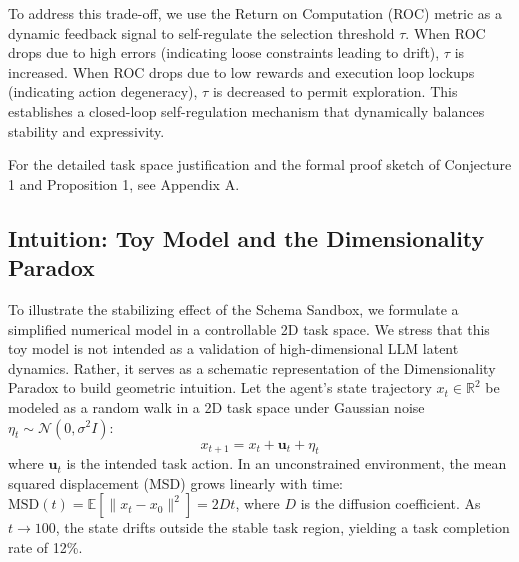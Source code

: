 \documentclass[10pt,journal,compsoc]{IEEEtran}
\begin{document}
To address this trade-off, we use the Return on Computation (ROC) metric as a dynamic feedback signal to self-regulate the selection threshold $\tau$. When ROC drops due to high errors (indicating loose constraints leading to drift), $\tau$ is increased. When ROC drops due to low rewards and execution loop lockups (indicating action degeneracy), $\tau$ is decreased to permit exploration. This establishes a closed-loop self-regulation mechanism that dynamically balances stability and expressivity.

For the detailed task space justification and the formal proof sketch of Conjecture 1 and Proposition 1, see Appendix A.

\subsection{Intuition: Toy Model and the Dimensionality Paradox}
To illustrate the stabilizing effect of the Schema Sandbox, we formulate a simplified numerical model in a controllable 2D task space. We stress that this toy model is not intended as a validation of high-dimensional LLM latent dynamics. Rather, it serves as a schematic representation of the Dimensionality Paradox to build geometric intuition. Let the agent's state trajectory $x_t \in \mathbb{R}^2$ be modeled as a random walk in a 2D task space under Gaussian noise $\eta_t \sim \mathcal{N}(0, \sigma^2 I)$:
\begin{equation}
x_{t+1} = x_t + \mathbf{u}_t + \eta_t
\end{equation}
where $\mathbf{u}_t$ is the intended task action. In an unconstrained environment, the mean squared displacement (MSD) grows linearly with time: $\text{MSD}(t) = \mathbb{E}[\|x_t - x_0\|^2] = 2Dt$, where $D$ is the diffusion coefficient. As $t \to 100$, the state drifts outside the stable task region, yielding a task completion rate of 12\%.
\end{document}
